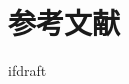 \documentclass{jsarticle}
\begin{document}
    \fi
    \section{参考文献}

    \expandafter\ifx\csname ifdraft\endcsname\relax
\end{document}
